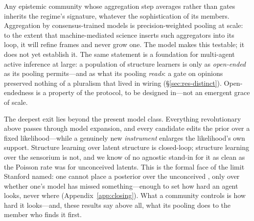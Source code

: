 \documentclass[runningheads]{llncs}
\begin{document}
Any epistemic community whose aggregation step averages rather than gates inherits the regime's
signature, whatever the sophistication of its members. Aggregation by consensus-trained models is
precision-weighted pooling at scale: to the extent that machine-mediated science inserts such
aggregators into its loop, it will refine frames and never grow one. The model makes this
testable; it does not yet establish it. The same statement is a foundation for multi-agent active
inference at large: a population of structure learners is only as \emph{open-ended} as its
pooling permits---and as what its pooling \emph{reads}: a gate on opinions preserved nothing of
a pluralism that lived in wiring (\S\ref{sec:res-distinct}). Open-endedness is a property of the
protocol, to be designed in---not an emergent grace of scale.

The deepest exit lies beyond the present model class. Everything revolutionary above passes
through model expansion, and every candidate edits the prior over a fixed likelihood---while a
genuinely new \emph{instrument} enlarges the likelihood's own support. Structure learning over
latent structure is closed-loop; structure learning over the sensorium is not, and we know of no
agnostic stand-in for it as clean as the Poisson rate was for unconceived latents. This is the
formal face of the limit Stanford named: one cannot place a posterior over the unconceived
\citep{stanford2006}, only over whether one's model has missed something---enough to set how hard
an agent looks, never where (Appendix~\ref{app:closing}). What a community controls is how hard
it looks---and, these results say above all, what its pooling does to the member who finds it
first.
\end{document}
